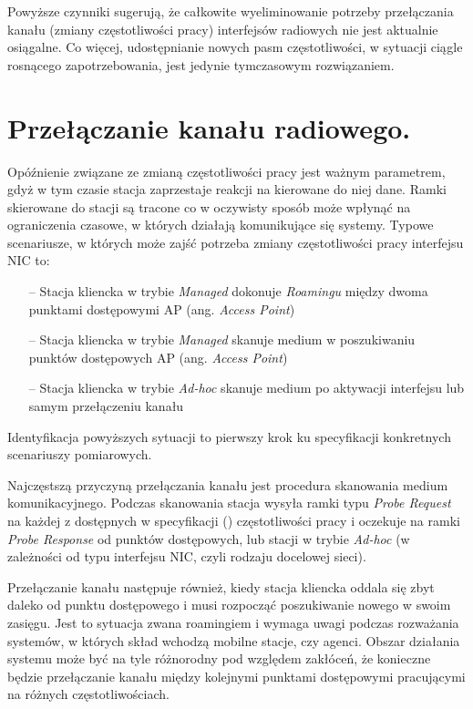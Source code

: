 Powyższe czynniki sugerują, że całkowite wyeliminowanie potrzeby przełączania kanału (zmiany częstotliwości pracy) interfejsów radiowych nie jest aktualnie osiągalne. Co więcej, udostępnianie nowych pasm częstotliwości, w sytuacji ciągle rosnącego zapotrzebowania, jest jedynie tymczasowym rozwiązaniem.  


\section{Przełączanie kanału radiowego.}
Opóźnienie związane ze zmianą częstotliwości pracy jest ważnym parametrem, gdyż w tym czasie stacja zaprzestaje reakcji na kierowane do niej dane. Ramki skierowane do stacji są tracone co w oczywisty sposób może wpłynąć na ograniczenia czasowe, w których działają komunikujące się systemy. 
Typowe scenariusze, w których może zajść potrzeba zmiany częstotliwości pracy interfejsu NIC to:
\begin{itemize}
\item[--] Stacja kliencka w trybie \emph{Managed} dokonuje \emph{Roamingu} między dwoma punktami dostępowymi AP (ang. \emph{Access Point}) 
\item[--] Stacja kliencka w trybie \emph{Managed} skanuje medium w poszukiwaniu punktów dostępowych AP (ang. \emph{Access Point})
\item[--] Stacja kliencka w trybie \emph{Ad-hoc} skanuje medium po aktywacji interfejsu lub samym przełączeniu kanału 
\end{itemize}
Identyfikacja powyższych sytuacji to pierwszy krok ku specyfikacji konkretnych scenariuszy pomiarowych. 

Najczęstszą przyczyną przełączania kanału jest procedura skanowania medium komunikacyjnego. Podczas skanowania stacja wysyła ramki typu \emph{Probe Request} na każdej z dostępnych w specyfikacji (\cite{std:IEEE80211}) częstotliwości pracy i oczekuje na ramki \emph{Probe Response} od punktów dostępowych, lub stacji w trybie \emph{Ad-hoc} (w zależności od typu interfejsu NIC, czyli rodzaju docelowej sieci).

Przełączanie kanału następuje również, kiedy stacja kliencka oddala się zbyt daleko od punktu dostępowego i musi rozpocząć poszukiwanie nowego w swoim zasięgu. Jest to sytuacja zwana roamingiem i wymaga uwagi podczas rozważania systemów, w których skład wchodzą mobilne stacje, czy agenci. Obszar działania systemu może być na tyle różnorodny pod względem zakłóceń, że konieczne będzie przełączanie kanału między kolejnymi punktami dostępowymi pracującymi na różnych częstotliwościach.

